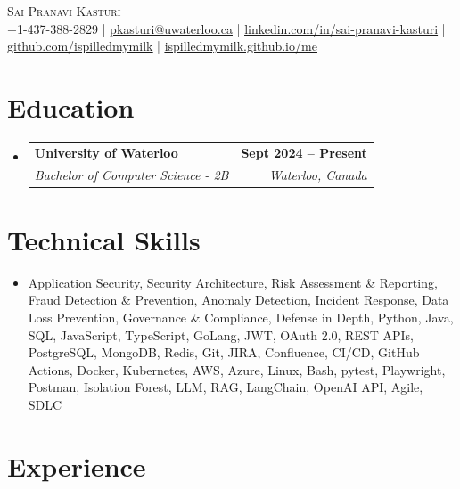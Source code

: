 \documentclass[letterpaper,10pt]{article}
\makeatletter
\newcommand{\resumeSubheading}[4]{
  \vspace{-1pt}\item
    \begin{tabular*}{1.0\textwidth}[t]{l@{\extracolsep{\fill}}r}
      \textbf{#1} & \textbf{\small #2} \\
      \textit{\small#3} & \textit{\small #4} \\[-2pt]
    \end{tabular*}\vspace{-7pt}
}
\newcommand{\resumeSubHeadingListStart}{\begin{itemize}[leftmargin=0.0in, label={}]}
\newcommand{\resumeSubHeadingListEnd}{\end{itemize}}
\makeatother
\begin{document}

\vspace{-28pt}
\begin{center}
    {\Huge \scshape Sai Pranavi Kasturi} \\ 
    
    \small +1-437-388-2829 | \underline{pkasturi@uwaterloo.ca} | \href{https://linkedin.com/in/sai-pranavi-kasturi-704807298}{\underline{linkedin.com/in/sai-pranavi-kasturi}} | \href{https://github.com/ispilledmymilk}{\underline{github.com/ispilledmymilk}} | \href{https://ispilledmymilk.github.io/me/}{\underline{ispilledmymilk.github.io/me}}
    \vspace{-10pt}
\end{center}

\vspace{-10pt}
\section{Education}
  \resumeSubHeadingListStart
    \resumeSubheading
      {University of Waterloo}{Sept 2024 -- Present}
      {Bachelor of Computer Science - 2B}{Waterloo, Canada}
  \resumeSubHeadingListEnd
\vspace{-8pt}


\section{Technical Skills}
\begin{itemize}[leftmargin=0.05in, label={}]
  \small\item{
    Application Security, Security Architecture, Risk Assessment \& Reporting, Fraud Detection \& Prevention, Anomaly Detection, Incident Response, Data Loss Prevention, Governance \& Compliance, Defense in Depth, Python, Java, SQL, JavaScript, TypeScript, GoLang, JWT, OAuth 2.0, REST APIs, PostgreSQL, MongoDB, Redis, Git, JIRA, Confluence, CI/CD, GitHub Actions, Docker, Kubernetes, AWS, Azure, Linux, Bash, pytest, Playwright, Postman, Isolation Forest, LLM, RAG, LangChain, OpenAI API, Agile, SDLC
  }
\end{itemize}
\vspace{-18pt}

\vspace{1.20pt}
\section{Experience}
\end{document}
